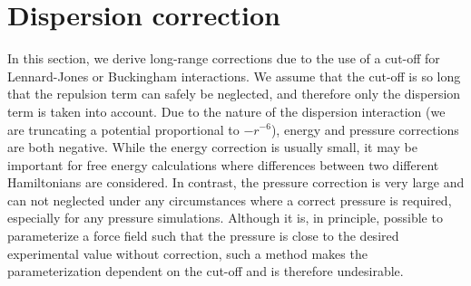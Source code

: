 \newcommand{\dr}{{\rm d}r}
\newcommand{\avcsix}{\left< C_6 \right>}

\section{Dispersion correction}
In this section, we derive long-range corrections due to the use of a
cut-off for Lennard-Jones or Buckingham interactions.
We assume that the cut-off is
so long that the repulsion term can safely be neglected, and therefore
only the dispersion term is taken into account. Due to the nature of
the dispersion interaction (we are truncating a potential proportional
to $-r^{-6}$), energy and pressure corrections are both negative. While
the energy correction is usually small, it may be important for free
energy calculations where differences between two different Hamiltonians
are considered. In contrast, the pressure correction is very large and
can not neglected under any circumstances where a correct pressure is
required, especially for any pressure simulations. Although it is, in
principle, possible to parameterize a force field such that the pressure
is close to the desired experimental value without correction, such a
method makes the parameterization dependent on the cut-off and is therefore
undesirable.

